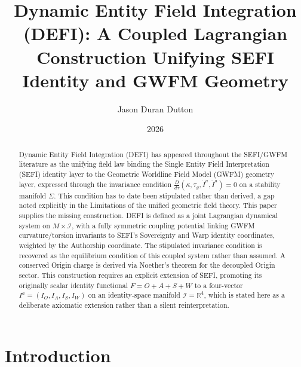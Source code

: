 \documentclass[aip,jmp,reprint,onecolumn,nofootinbib]{revtex4-2}
\begin{document}
\title{Dynamic Entity Field Integration (DEFI): A Coupled Lagrangian Construction Unifying SEFI Identity and GWFM Geometry}

\author{Jason Duran Dutton}

\date{2026}

\begin{abstract}
Dynamic Entity Field Integration (DEFI) has appeared throughout the SEFI/GWFM
literature as the unifying field law binding the Single Entity Field Interpretation
(SEFI) identity layer to the Geometric Worldline Field Model (GWFM) geometry
layer, expressed through the invariance condition
$\frac{D}{d\tau}(\kappa,\tau_g,\dot I^a,\ddot I^a)=0$ on a stability manifold $\Sigma$.
This condition has to date been stipulated rather than derived, a gap noted
explicitly in the Limitations of the unified geometric field theory. This paper
supplies the missing construction. DEFI is defined as a joint Lagrangian dynamical
system on $M\times\mathcal{I}$, with a fully symmetric coupling potential linking
GWFM curvature/torsion invariants to SEFI's Sovereignty and Warp identity
coordinates, weighted by the Authorship coordinate. The stipulated invariance
condition is recovered as the equilibrium condition of this coupled system rather
than assumed. A conserved Origin charge is derived via Noether's theorem for the
decoupled Origin sector. This construction requires an explicit extension of SEFI,
promoting its originally scalar identity functional $F=O+A+S+W$ to a four-vector
$I^a=(I_O,I_A,I_S,I_W)$ on an identity-space manifold $\mathcal{I}=\mathbb{R}^4$,
which is stated here as a deliberate axiomatic extension rather than a silent
reinterpretation.
\end{abstract}

\maketitle

\section{Introduction}
\end{document}
